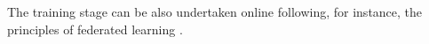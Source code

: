 The training stage can be also undertaken online following, for instance, the
principles of federated learning \cite{mcmahan2016}.
